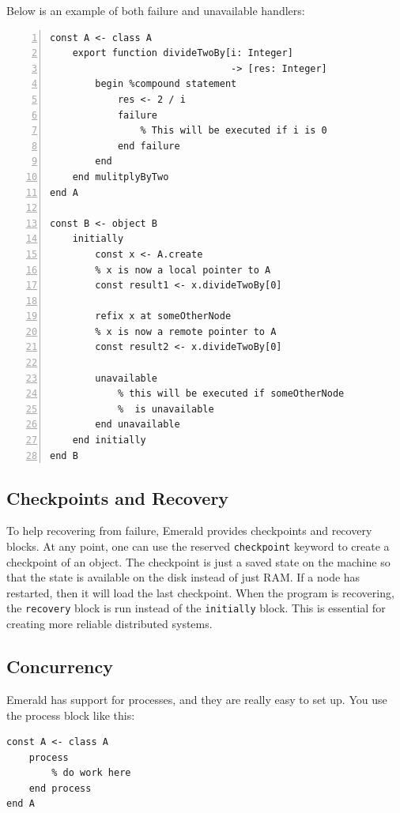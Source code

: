 Below is an example of both failure and unavailable handlers:
\begin{lstlisting}[language=emerald, numbers=left]
const A <- class A
    export function divideTwoBy[i: Integer] 
                                -> [res: Integer]
        begin %compound statement
            res <- 2 / i
            failure
                % This will be executed if i is 0
            end failure
        end
    end mulitplyByTwo
end A

const B <- object B
    initially
        const x <- A.create
        % x is now a local pointer to A
        const result1 <- x.divideTwoBy[0]
        
        refix x at someOtherNode
        % x is now a remote pointer to A
        const result2 <- x.divideTwoBy[0]
        
        unavailable
            % this will be executed if someOtherNode
            %  is unavailable
        end unavailable
    end initially
end B
\end{lstlisting}






\subsection{Checkpoints and Recovery}
To help recovering from failure, Emerald provides checkpoints and recovery blocks. At any point, one can use the reserved \verb|checkpoint| keyword to create a checkpoint of an object. The checkpoint is just a saved state on the machine so that the state is available on the disk instead of just RAM. If a node has restarted, then it will load the last checkpoint. When the program is recovering, the \verb|recovery| block is run instead of the \verb|initially| block. This is essential for creating more reliable distributed systems.



\subsection{Concurrency}
Emerald has support for processes, and they are really easy to set up. You use the process block like this:
\begin{lstlisting}[language=emerald]
const A <- class A
    process
        % do work here
    end process
end A
\end{lstlisting}

